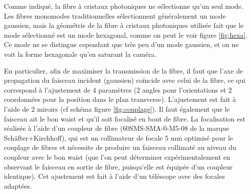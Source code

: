 \documentclass[11pt,a4paper] { article}
\begin{document}
Comme indiqué, la fibre à cristaux photoniques ne sélectionne qu'un seul mode. Les fibres monomodes traditionnelles sélectionnent généralement un mode gaussien, mais la géométrie de la fibre à cristaux photoniques utilisée fait que le mode sélectionné est un mode hexagonal, comme on peut le voir figure \ref{fig:hexa}. Ce mode ne se distingue cependant que très peu d'un mode gaussien, et on ne voit la forme hexagonale qu'en saturant la caméra.

En particulier, afin de maximiser la transmission de la fibre, il faut que l'axe de propagation du faisceau incident (gaussien) coïncide avec celui de la fibre, ce qui correspond à l'ajustement de 4 paramètres (2 angles pour l'orientations et 2 coordonnées pour la position dans le plan transverse). L'ajustement est fait à l'aide de 2 miroirs (cf schéma figure \ref{fig:couplage}). Il faut également que le faisceau ait le bon waist et qu'il soit focalisé en bout de fibre. La focalisation est réalisée à l'aide d'un coupleur de fibre (60SMS-SMA-0-M5-08 de la marque Schäfter+Kirchhoff), qui est un collimateur de focale 5 mm optimisé pour le couplage de fibres et nécessite de produire un faisceau collimaté au niveau du coupleur avec le bon waist (que l'on peut déterminer expérimentalement en observant le faisceau en sortie de fibre, puisqu'elle est équipée d'un coupleur identique). Cet ajustement est fait à l'aide d'un téléscope avec des focales adaptées.
\end{document}
